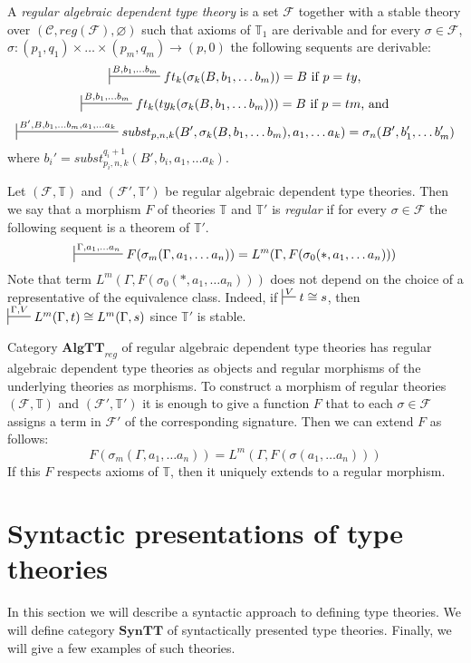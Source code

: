 \documentclass[reqno]{amsart}
\theoremstyle{definition}
\theoremstyle{remark}
\newcommand{\cat}[1]{\mathbf{#1}}
\newcommand{\syntt}{\cat{SynTT}}
\newcommand{\algtt}{\cat{AlgTT}}
\numberwithin{figure}{section}
\begin{document}
\begin{defn}
A \emph{regular algebraic dependent type theory} is a set $\mathcal{F}$ together with a stable theory over $(\mathcal{C}, reg(\mathcal{F}), \varnothing)$
such that axioms of $\mathbb{T}_1$ are derivable and for every $\sigma \in \mathcal{F}$, $\sigma : (p_1,q_1) \times \ldots \times (p_m,q_m) \to (p,0)$ the following sequents are derivable:
\[ \sststile{}{B, b_1, \ldots b_m} ft_k(\sigma_k(B, b_1, \ldots b_m)) = B \text{ if $p = ty$,} \]
\[ \sststile{}{B, b_1, \ldots b_m} ft_k(ty_k(\sigma_k(B, b_1, \ldots b_m))) = B \text{ if $p = tm$, and} \]
\[ \sststile{}{B', B, b_1, \ldots b_m, a_1, \ldots a_k} subst_{p,n,k}(B', \sigma_k(B, b_1, \ldots b_m), a_1, \ldots a_k) = \sigma_n(B', b_1', \ldots b_m') \]
where $b_i' = subst_{p_i,n,k}^{q_i+1}(B', b_i, a_1, \ldots a_k)$.
\end{defn}

Let $(\mathcal{F},\mathbb{T})$ and $(\mathcal{F}',\mathbb{T}')$ be regular algebraic dependent type theories.
Then we say that a morphism $F$ of theories $\mathbb{T}$ and $\mathbb{T}'$ is \emph{regular} if for every $\sigma \in \mathcal{F}$ the following sequent is a theorem of $\mathbb{T}'$.
\[ \sststile{}{\Gamma, a_1, \ldots a_n} F(\sigma_m(\Gamma, a_1, \ldots a_n)) = L^m(\Gamma, F(\sigma_0(*, a_1, \ldots a_n))) \]
Note that term $L^m(\Gamma, F(\sigma_0(*, a_1, \ldots a_n)))$ does not depend on the choice of a representative of the equivalence class.
Indeed, if $\sststile{}{V} t \cong s$, then $\sststile{}{\Gamma,V} L^m(\Gamma,t) \cong L^m(\Gamma,s)$ since $\mathbb{T}'$ is stable.

Category $\algtt_{reg}$ of regular algebraic dependent type theories has regular algebraic dependent type theories as objects and regular morphisms of the underlying theories as morphisms.
To construct a morphism of regular theories $(\mathcal{F},\mathbb{T})$ and $(\mathcal{F}',\mathbb{T}')$ it is enough to give a function $F$ that to each $\sigma \in \mathcal{F}$ assigns a term in $\mathcal{F}'$ of the corresponding signature.
Then we can extend $F$ as follows:
\[ F(\sigma_m(\Gamma, a_1, \ldots a_n)) = L^m(\Gamma, F(\sigma(a_1, \ldots a_n))) \]
If this $F$ respects axioms of $\mathbb{T}$, then it uniquely extends to a regular morphism.

\section{Syntactic presentations of type theories}

In this section we will describe a syntactic approach to defining type theories.
We will define category $\syntt$ of syntactically presented type theories.
Finally, we will give a few examples of such theories.
\end{document}
